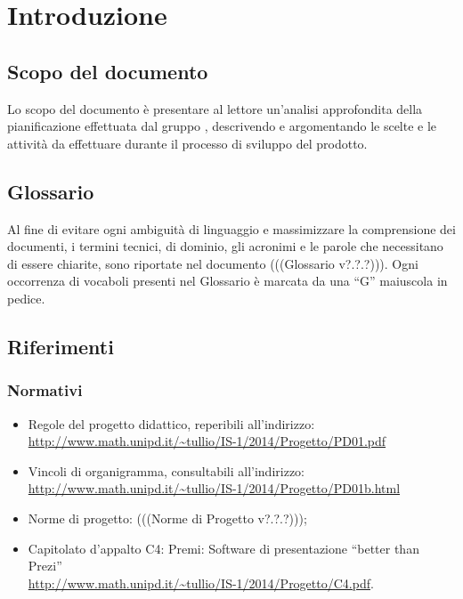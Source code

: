 \section{Introduzione}
\subsection{Scopo del documento}
Lo scopo del documento è presentare al lettore un'analisi approfondita della pianificazione effettuata dal gruppo \gruppo, descrivendo e argomentando le scelte e le attività da effettuare durante il processo di sviluppo del prodotto.
\subsection{Glossario}
Al fine di evitare ogni ambiguità di linguaggio e massimizzare la comprensione dei documenti, i termini tecnici, di dominio, gli acronimi e le parole che necessitano di essere chiarite, sono riportate nel documento (((Glossario v?.?.?))). Ogni occorrenza di vocaboli presenti nel Glossario è marcata da una “G” maiuscola in pedice.
\subsection{Riferimenti}

\subsubsection{Normativi}
\begin{itemize}

\item Regole del progetto didattico, reperibili all'indirizzo:\\ \url{http://www.math.unipd.it/~tullio/IS-1/2014/Progetto/PD01.pdf}
\item Vincoli di organigramma, consultabili all’indirizzo:\\ \url{http://www.math.unipd.it/~tullio/IS-1/2014/Progetto/PD01b.html}
\item Norme di progetto: (((Norme di Progetto v?.?.?)));
\item Capitolato d’appalto C4: Premi: Software di presentazione “better than Prezi” \\
\url{http://www.math.unipd.it/~tullio/IS-1/2014/Progetto/C4.pdf}.
\end{itemize}

